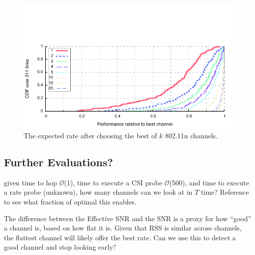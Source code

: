 \begin{figure}[htp]
	\centering
	\includegraphics[width=\textwidth]{figures/applications/chan_sel_rel_diff_draws.pdf}
	\caption{\label{fig:rel_diff_draws}The expected rate after choosing the best of $k$ 802.11n channels.}
\end{figure}


\subsection{Further Evaluations?}
  given time to hop $\mathcal{O}$(1\ms), time to execute a CSI probe $\mathcal{O}$(500\us), and time to execute a rate probe (unknown), how many channels can we look at in $T$ time? Reference  to see what fraction of optimal this enables.

 The difference between the Effective SNR and the SNR is a proxy for how ``good'' a channel is, based on how flat it is. Given that RSS is similar across channels, the flattest channel will likely offer the best rate. Can we use this to detect a good channel and stop looking early?